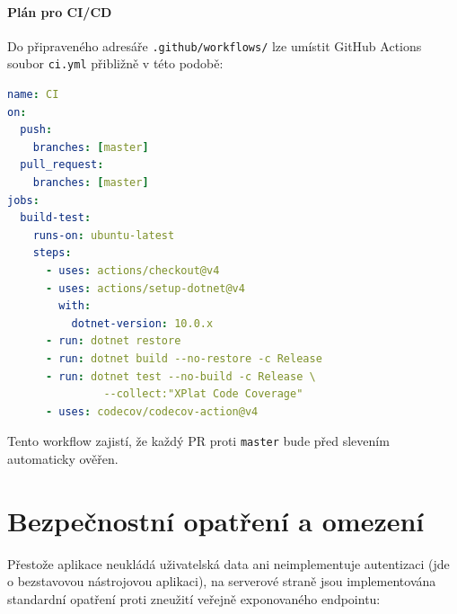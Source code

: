 \documentclass[12pt,a4paper]{article}
\begin{document}
\paragraph{Plán pro CI/CD}
Do připraveného adresáře \texttt{.github/workflows/} lze umístit
GitHub Actions soubor \texttt{ci.yml} přibližně v této podobě:

\begin{lstlisting}[language=yaml]
name: CI
on:
  push:
    branches: [master]
  pull_request:
    branches: [master]
jobs:
  build-test:
    runs-on: ubuntu-latest
    steps:
      - uses: actions/checkout@v4
      - uses: actions/setup-dotnet@v4
        with:
          dotnet-version: 10.0.x
      - run: dotnet restore
      - run: dotnet build --no-restore -c Release
      - run: dotnet test --no-build -c Release \
               --collect:"XPlat Code Coverage"
      - uses: codecov/codecov-action@v4
\end{lstlisting}

Tento workflow zajistí, že každý PR proti \texttt{master} bude před
slevením automaticky ověřen.

\section{Bezpečnostní opatření a omezení}
\label{sec:security}

Přestože aplikace neukládá uživatelská data ani neimplementuje
autentizaci (jde o bezstavovou nástrojovou aplikaci), na serverové
straně jsou implementována standardní opatření proti zneužití
veřejně exponovaného endpointu:
\end{document}
